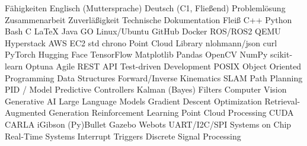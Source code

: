 
\begin{rubric}{Fähigkeiten}
\entry*[Sprachen]
	\skilldotfirst Englisch (Muttersprache) \skilldot Deutsch (C1, Fließend)
\entry*[Stärken] 
	\skilldotfirst Problemlösung \skilldot Zusammenarbeit \skilldot Zuverläßigkeit \newline \skilldotfirst Technische Dokumentation \skilldot Fleiß %
\entry*[Coding]
	\skilldotfirst C++ \skilldot Python \skilldot Bash \skilldot C \skilldot LaTeX \skilldot Java \skilldot GO
\entry*[Software] 
	\skilldotfirst Linux/Ubuntu \skilldot GitHub \skilldot Docker \skilldot ROS/ROS2 \skilldot QEMU \newline \skilldotfirst Hyperstack \skilldot AWS EC2
 \entry*[Libraries (C++)] 
 	\skilldotfirst std \skilldot chrono \skilldot Point Cloud Library \skilldot nlohmann/json \skilldot curl
\entry*[Libraries (Py)] 
	\skilldotfirst PyTorch \skilldot Hugging Face \skilldot TensorFlow \skilldot Matplotlib \skilldot Pandas \newline \skilldot OpenCV \skilldot NumPy \skilldot scikit-learn \skilldot Optuna
\entry*[Wissen] 	
	\skilldotfirst Agile \skilldot REST API \skilldot Test-driven Development \skilldot POSIX  \newline \skilldotfirst Object Oriented Programming \skilldot Data Structures 
\entry*[Robotics]
	\skilldotfirst Forward/Inverse Kinematics \skilldot SLAM \skilldot Path Planning \newline \skilldotfirst PID / Model Predictive Controllers \skilldot Kalman (Bayes) Filters
	\skilldotfirst Computer Vision \skilldot Generative AI \skilldot Large Language Models \newline \skilldotfirst Gradient Descent Optimization \skilldot Retrieval-Augmented Generation \newline \skilldotfirst Reinforcement Learning  \skilldot Point Cloud Processing \skilldot CUDA
\entry*[Simulators] 
	\skilldotfirst CARLA \skilldot iGibson \skilldot (Py)Bullet \skilldot Gazebo \skilldot Webots
\entry*[Microcontrollers]
	\skilldotfirst UART/I2C/SPI \skilldot Systems on Chip \skilldot Real-Time Systems \newline \skilldotfirst Interrupt Triggers \skilldot Discrete Signal Processing

\end{rubric}
